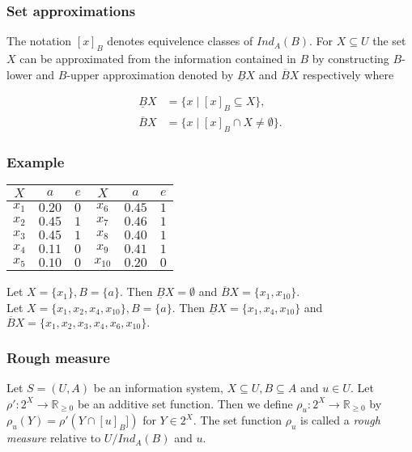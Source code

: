 \documentclass[envcountsect]{beamer}
\begin{document}
\begin{frame}
	\frametitle{Set approximations}
	The notation $[x]_B$ denotes equivelence classes of $Ind_A(B)$. For $X \subseteq U$ the set $X$ can be approximated from the information contained in $B$ by constructing $B$-lower and $B$-upper approximation denoted by $\underline{B}X$ and $\overline{B}X$ respectively where 

	\begin{equation*}
		\begin{split}
			\underline{B}X &= \{x \; | \; [x]_B \subseteq X \},	\\
			\overline{B}X &= \{x \; | \; [x]_B \cap X \neq \emptyset \}.
		\end{split}
	\end{equation*}

\end{frame}
\begin{frame}

	\frametitle{Example}
\begin{table}
	\begin{tabular}{cccccc}
		\hline 
		$X$& $a$& $e$& $X$& $a$& $e$\\
		\hline
		$x_1$ & $0.20$ & $0$&  $x_6$ & $0.45$ & $1$ \\
		$x_2$ & $0.45$ & $1$ & $x_7$ & $0.46$ & $1$ \\
		$x_3$ & $0.45$ & $1$ & $x_8$ & $0.40$ & $1$  \\
		$x_4$ & $0.11$ & $0$ & $x_9$ & $0.41$ & $1$ \\
		$x_5$ & $0.10$ & $0$ & $x_{10}$ & $0.20$ & $0$\\
		\hline
	\end{tabular}
\end{table}


	Let $X= \{x_1\}, B=\{a\}.$ Then $\underline{B}X = \emptyset$ and $\overline{B}X = \{x_1,x_{10}\}$.\\
		Let $X=\{x_1,x_2,x_4,x_{10}\}, B=\{a\}.$ Then $\underline{B}X = \{x_1,x_4,x_{10}\}$ and $\overline{B}X = \{x_1,x_2,x_3,x_4,x_6,x_{10}\}. $ 
\end{frame}


\begin{frame}

\frametitle{Rough measure}

\begin{definition}
	Let $S=(U,A)$ be an information system, $X \subseteq U, B\subseteq A$ and $u \in U$. Let $\rho' : 2^X \rightarrow \mathbb{R}_{\geq0}$ be an additive set function. Then we define $\rho_u : 2^X \rightarrow \mathbb{R}_{\geq 0}$ by $\rho_u(Y) = \rho'(Y\cap [u]_B])$ for $Y \in 2^X$. The set function $\rho_u$ is called a \emph{rough measure} relative to $U/Ind_A(B)$ and $u$.
\end{definition}

\end{frame}
\end{document}
